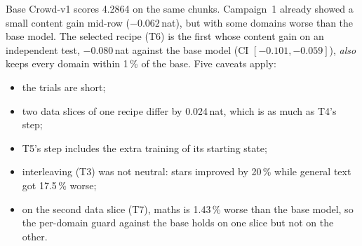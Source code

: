 \documentclass[11pt,a4paper]{article}
\begin{document}
\begin{center}\small
{}
\end{center}

\noindent Base Crowd-v1 scores 4.2864 on the same chunks. Campaign~1 already showed a small content gain mid-row
($-0.062$\,nat), but with some domains worse than the base model. The selected recipe (T6) is the first whose content
gain on an independent test, $-0.080$\,nat against the base model (CI $[-0.101,-0.059]$), \emph{also} keeps every
domain within 1\,\% of the base. Five caveats apply:
\begin{itemize}[leftmargin=*,itemsep=2pt]
  \item the trials are short;
  \item two data slices of one recipe differ by 0.024\,nat, which is as much as T4's step;
  \item T5's step includes the extra training of its starting state;
  \item interleaving (T3) was not neutral: stars improved by 20\,\% while general text got 17.5\,\% worse;
  \item on the second data slice (T7), maths is 1.43\,\% worse than the base model, so the per-domain guard against the
    base holds on one slice but not on the other.
\end{itemize}
\end{document}
